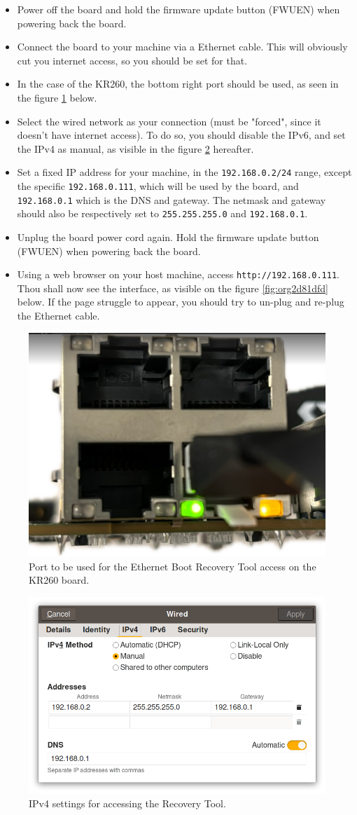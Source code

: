 \documentclass[10pt]{article}
\begin{document}
\begin{itemize}
\item Power off the board and hold the firmware update button (FWUEN) when powering back the board.
\item Connect the board to your machine via a Ethernet cable.
This will obviously cut you internet access, so you should be set for that.
\item In the case of the KR260, the bottom right port should be used, as seen in the
figure \ref{fig:orgeba475e} below.
\item Select the wired network as your connection (must be "forced", since it
doesn't have internet access). To do so, you should disable the IPv6, and set
the IPv4 as manual, as visible in the figure \ref{fig:org27d50bb} hereafter.
\item Set a fixed IP address for your machine, in the \texttt{192.168.0.2/24}
range, except the specific \texttt{192.168.0.111}, which will be used by the
board, and \texttt{192.168.0.1} which is the DNS and gateway.
The netmask and gateway should also be respectively set to
\texttt{255.255.255.0} and \texttt{192.168.0.1}.
\item Unplug the board power cord again. Hold the firmware update button (FWUEN)
when powering back the board.
\item Using a web browser on your host machine, access \texttt{http://192.168.0.111}. Thou
shall now see the interface, as visible on the figure \ref{fig:org2d81dfd} below. If
the page struggle to appear, you should try to un-plug and re-plug the
Ethernet cable.
\end{itemize}

\begin{figure}[htbp]
\centering
\includegraphics[width=.4\textwidth]{img/krport.png}
\caption{\label{fig:orgeba475e}Port to be used for the Ethernet Boot Recovery Tool access on the KR260 board.}
\end{figure}

\begin{figure}[htbp]
\centering
\includegraphics[width=.6\textwidth]{img/ipv4set.png}
\caption{\label{fig:org27d50bb}IPv4 settings for accessing the Recovery Tool.}
\end{figure}
\end{document}

